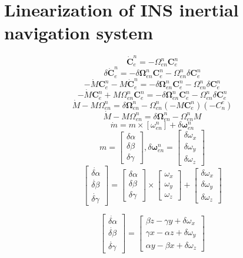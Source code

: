 \section{Linearization of INS inertial navigation system}
\[
    \bm{\dot{C}}_e^n = -\Omega_{en}^n \bm{C}_e^n
\]
\[
\delta \dot{\bm{C}}_e^n = -\delta \bm{\Omega}_{en}^n\bm{C}_e^n - \Omega_{en}^n \delta \bm{C}_e^n
\]
\[
    -\dot{M} \bm{C}_e^n - M \dot{\bm{C}}_e^n = -\delta \bm{\Omega}_{en}^n\bm{C}_e^n - \Omega_{en}^n \delta \bm{C}_e^n
\]
\[
    -\dot{M} \bm{C}_e^n + M \Omega_{en}^n \bm{C}_e^n = -\delta \bm{\Omega}_{en}^n\bm{C}_e^n - \Omega_{en}^n \delta \bm{C}_e^n
\]
\[
    \dot{M} - M \Omega_{en}^n = \delta \bm{\Omega}_{en}^n - \Omega_{en}^n (-M\bm{C}_e^n)(-C_n^e)
\]
\[
    \dot{M} - M \Omega_{en}^n = \delta \bm{\Omega}_{en}^n - \Omega_{en}^n M
\]
\[
    \dot{m} = m\times[\omega_{en}^n ] + \delta \bm{\omega}_{en}^n
\]
\[
    m = \begin{bmatrix}
        \delta \alpha \\
        \delta \beta \\
        \delta \gamma
    \end{bmatrix}, \delta \bm{\omega}_{en}^n = \begin{bmatrix}
        \delta \omega_x \\
        \delta \omega_y \\
        \delta \omega_z
    \end{bmatrix}
\]
\[
    \begin{bmatrix}
        \dot{\delta \alpha} \\
        \dot{\delta \beta} \\
        \dot{\delta \gamma}
    \end{bmatrix} = 
    \begin{bmatrix}
        \delta \alpha \\
        \delta \beta \\
        \delta \gamma
    \end{bmatrix} \times \begin{bmatrix}
        \omega_x \\
        \omega_y \\
        \omega_z
    \end{bmatrix} + \begin{bmatrix}
        \delta \omega_x \\
        \delta \omega_y \\
        \delta \omega_z
    \end{bmatrix}
\]

\[
    \begin{bmatrix}
        \dot{\delta \alpha} \\
        \dot{\delta \beta} \\
        \dot{\delta \gamma}
    \end{bmatrix} = \begin{bmatrix}
        \beta z - \gamma y + \delta \omega_x \\
        \gamma x - \alpha z + \delta \omega_y \\
        \alpha y - \beta x + \delta \omega_z
    \end{bmatrix}
\]